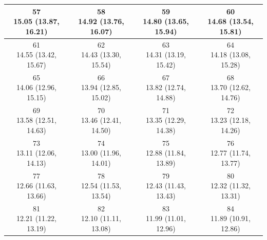 \begin{table}[htbp]
\begin{tabular}{cccc}
\hline
\shortstack[c]{57\\15.05 (13.87, 16.21)} & \shortstack[c]{58\\14.92 (13.76, 16.07)} & \shortstack[c]{59\\14.80 (13.65, 15.94)} & \shortstack[c]{60\\14.68 (13.54, 15.81)} \\
\hline
\shortstack[c]{61\\14.55 (13.42, 15.67)} & \shortstack[c]{62\\14.43 (13.30, 15.54)} & \shortstack[c]{63\\14.31 (13.19, 15.42)} & \shortstack[c]{64\\14.18 (13.08, 15.28)} \\
\hline
\shortstack[c]{65\\14.06 (12.96, 15.15)} & \shortstack[c]{66\\13.94 (12.85, 15.02)} & \shortstack[c]{67\\13.82 (12.74, 14.88)} & \shortstack[c]{68\\13.70 (12.62, 14.76)} \\
\hline
\shortstack[c]{69\\13.58 (12.51, 14.63)} & \shortstack[c]{70\\13.46 (12.41, 14.50)} & \shortstack[c]{71\\13.35 (12.29, 14.38)} & \shortstack[c]{72\\13.23 (12.18, 14.26)} \\
\hline
\shortstack[c]{73\\13.11 (12.06, 14.13)} & \shortstack[c]{74\\13.00 (11.96, 14.01)} & \shortstack[c]{75\\12.88 (11.84, 13.89)} & \shortstack[c]{76\\12.77 (11.74, 13.77)} \\
\hline
\shortstack[c]{77\\12.66 (11.63, 13.66)} & \shortstack[c]{78\\12.54 (11.53, 13.54)} & \shortstack[c]{79\\12.43 (11.43, 13.43)} & \shortstack[c]{80\\12.32 (11.32, 13.31)} \\
\hline
\shortstack[c]{81\\12.21 (11.22, 13.19)} & \shortstack[c]{82\\12.10 (11.11, 13.08)} & \shortstack[c]{83\\11.99 (11.01, 12.96)} & \shortstack[c]{84\\11.89 (10.91, 12.86)} \\

\end{tabular}
\end{table}
